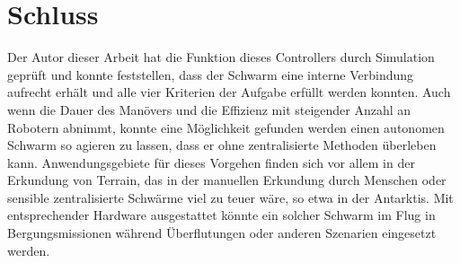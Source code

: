 \section{Schluss}

Der Autor dieser Arbeit hat die Funktion dieses Controllers durch Simulation geprüft und konnte feststellen,
dass der Schwarm eine interne Verbindung aufrecht erhält und alle vier Kriterien der Aufgabe erfüllt werden
konnten. Auch wenn die Dauer des Manövers und die Effizienz mit steigender Anzahl an Robotern abnimmt, konnte
eine Möglichkeit gefunden werden einen autonomen Schwarm so agieren zu lassen, dass er ohne zentralisierte
Methoden überleben kann. Anwendungsgebiete für dieses Vorgehen finden sich vor allem in der Erkundung von
Terrain, das in der manuellen Erkundung durch Menschen oder sensible zentralisierte Schwärme viel zu teuer 
wäre, so etwa in der Antarktis. Mit entsprechender Hardware ausgestattet könnte ein solcher Schwarm im Flug
in Bergungsmissionen während Überflutungen oder anderen Szenarien eingesetzt werden.